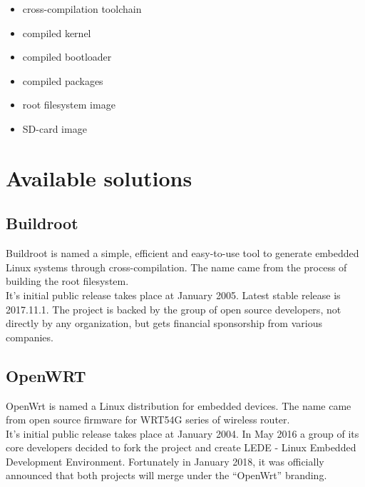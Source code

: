 \documentclass[printmode]{mgr}
\begin{document}
\begin{itemize}
    \item cross-compilation toolchain
    \item compiled kernel
    \item compiled bootloader
    \item compiled packages
    \item root filesystem image
    \item SD-card image
\end{itemize}

\chapter{Available solutions}



\section{Buildroot}

Buildroot is named a simple, efficient and easy-to-use tool to generate embedded Linux systems through cross-compilation. The name came from the process of building the root filesystem.
\\
It's initial public release takes place at January 2005. Latest stable release is 2017.11.1. The project is backed by the group of open source developers, not directly by any organization, but gets financial sponsorship from various companies.

\section{OpenWRT}

OpenWrt is named a Linux distribution for embedded devices. The name came from open source firmware for WRT54G series of wireless router.
\\
It's initial public release takes place at January 2004. In May 2016 a group of its core developers decided to fork the project and create LEDE - Linux Embedded Development Environment. Fortunately in January 2018, it was officially announced that both projects will merge under the ``OpenWrt'' branding.
\end{document}
